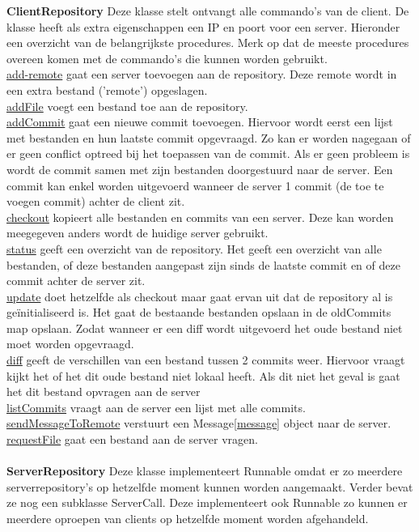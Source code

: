 \documentclass{article}
\begin{document}
\textbf{ClientRepository}\label{cr}
Deze klasse stelt ontvangt alle commando's van de client. De klasse heeft als extra eigenschappen een IP en poort voor een server. Hieronder een overzicht van de belangrijkste procedures. Merk op dat de meeste procedures overeen komen met de commando's die kunnen worden gebruikt.\\
\underline{add-remote} gaat een server toevoegen aan de repository. Deze remote wordt in een extra bestand ('remote') opgeslagen.\\
\underline{addFile} voegt een bestand toe aan de repository.\\
\underline{addCommit} gaat een nieuwe commit toevoegen. Hiervoor wordt eerst een lijst met bestanden en hun laatste commit opgevraagd. Zo kan er worden nagegaan of er geen conflict optreed bij het toepassen van de commit. Als er geen probleem is wordt de commit samen met zijn bestanden doorgestuurd naar de server. Een commit kan enkel worden uitgevoerd wanneer de server 1 commit (de toe te voegen commit) achter de client zit.\\
\underline{checkout} kopieert alle bestanden en commits van een server. Deze kan worden meegegeven anders wordt de huidige server gebruikt.\\
\underline{status} geeft een overzicht van de repository. Het geeft een overzicht van alle bestanden, of deze bestanden aangepast zijn sinds de laatste commit en of deze commit achter de server zit.\\
\underline{update} doet hetzelfde als checkout maar gaat ervan uit dat de repository al is ge\"{i}nitialiseerd is. Het gaat de bestaande bestanden opslaan in de oldCommits map opslaan. Zodat wanneer er een diff wordt uitgevoerd het oude bestand niet moet worden opgevraagd.\\
\underline{diff} geeft de verschillen van een bestand tussen 2 commits weer. Hiervoor vraagt kijkt het of het dit oude bestand niet lokaal heeft. Als dit niet het geval is gaat het dit bestand opvragen aan de server\\
\underline{listCommits} vraagt aan de server een lijst met alle commits. \\
\underline{sendMessageToRemote} verstuurt een Message\ref{message} object naar de server.\\
\underline{requestFile} gaat een bestand aan de server vragen.\\
\\
\textbf{ServerRepository}\label{sr} 
Deze klasse implementeert Runnable omdat er zo meerdere serverrepository's op hetzelfde moment kunnen worden aangemaakt. Verder bevat ze nog een subklasse ServerCall. Deze implementeert ook Runnable zo kunnen er meerdere oproepen van clients op hetzelfde moment worden afgehandeld.\\
\end{document}
